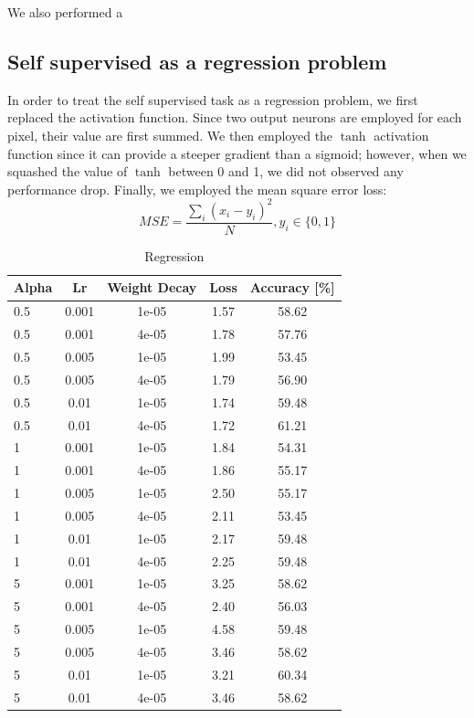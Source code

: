 \documentclass[10pt,twocolumn,letterpaper]{article}
\begin{document}
We also performed a 

\subsection{Self supervised as a regression problem}

In order to treat the self supervised task as a regression problem, we first replaced the activation function. Since two output neurons are employed for each pixel, their value are first summed. We then employed the $\tanh$ activation function since it can provide a steeper gradient than a sigmoid; however, when we squashed the value of $\tanh$ between 0 and 1, we did not observed any performance drop. Finally, we employed the mean square error loss: $$ MSE = \frac{\sum_i (x_i - y_i)^2}{N}, y_i \in \{0, 1\}$$

\begin{table}[h!]
	\begin{center}
		\begin{tabular}{lcc|cc}
			\textbf{Alpha} & \textbf{Lr} & \textbf{Weight Decay} & \textbf{Loss} & \textbf{Accuracy [\%]}\\
			\hline
			0.5&0.001&1e-05&1.57&58.62\\
			0.5&0.001&4e-05&1.78&57.76\\
			0.5&0.005&1e-05&1.99&53.45\\
			0.5&0.005&4e-05&1.79&56.90\\
			0.5&0.01&1e-05&1.74&59.48\\
			0.5&0.01&4e-05&1.72&61.21\\
			1&0.001&1e-05&1.84&54.31\\
			1&0.001&4e-05&1.86&55.17\\
			1&0.005&1e-05&2.50&55.17\\
			1&0.005&4e-05&2.11&53.45\\
			1&0.01&1e-05&2.17&59.48\\
			1&0.01&4e-05&2.25&59.48\\
			5&0.001&1e-05&3.25&58.62\\
			5&0.001&4e-05&2.40&56.03\\
			5&0.005&1e-05&4.58&59.48\\
			5&0.005&4e-05&3.46&58.62\\
			5&0.01&1e-05&3.21&60.34\\
			5&0.01&4e-05&3.46&58.62\\
			\hline
		\end{tabular}
	\end{center}	
	\caption{Regression}
\end{table}
\end{document}
